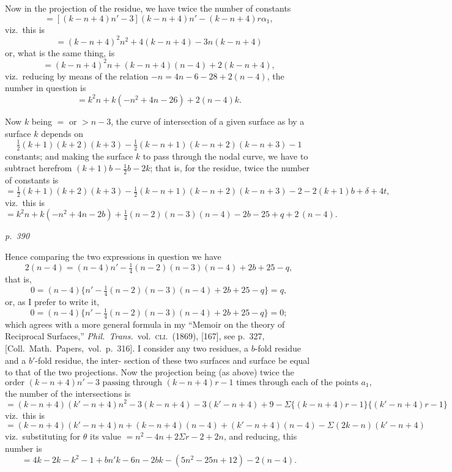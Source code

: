 \documentclass[11pt,a4paper]{article}
\theoremstyle{plain}
\theoremstyle{definition}
\begin{document}
Now in the projection of the residue, we have twice the number of constants
\[
= [(k - n + 4) n' - 3](k - n + 4)n' - (k - n + 4) r \alpha_1,
\]
viz.\ this is
\[
= (k - n + 4)^2 n^2 + 4(k - n + 4) - 3n(k - n + 4)
\]
or, what is the same thing, is
\[
= (k - n + 4)^2 n + (k - n + 4)(n - 4) + 2(k - n + 4),
\]
viz.\ reducing by means of the relation $-n = 4n - 6 - 28 + 2(n - 4)$, the number in
question is
\[
= k^2n + k(-n^2 + 4n - 26) + 2(n - 4) k.
\]

Now $k$ being $=$ or $> n - 3$, the curve of intersection of a given surface as by a
surface $k$ depends on
\[
\tfrac{1}{2}(k + 1)(k + 2)(k + 3) - \tfrac{1}{2}(k - n + 1)(k - n + 2)(k - n + 3) - 1
\]
constants; and making the surface $k$ to pass through the nodal curve, we have to subtract
herefrom $(k + 1)b - \tfrac{1}{2}b - 2k$; that is, for the residue, twice the number of constants is
\[
= \tfrac{1}{2}(k + 1)(k + 2)(k + 3) - \tfrac{1}{2}(k - n + 1)(k - n + 2)(k - n + 3) - 2 - 2(k + 1)b + \delta + 4t,
\]
viz.\ this is
\[
= k^2 n + k(-n^2 + 4n - 2b) + \tfrac{1}{4}(n - 2)(n - 3)(n - 4) - 2b - 25 + q + 2\,(n - 4).
\]

\clearpage

\bigskip
\textit{p.~390}
\smallskip

\noindent
Hence comparing the two expressions in question we have
\[
2(n - 4) = (n - 4)n' - \tfrac{1}{4}(n - 2)(n - 3)(n - 4) + 2 b + 25 - q,
\]
that is,
\[
0 = (n - 4)\{n' - \tfrac{1}{4}(n - 2)(n - 3)(n - 4) + 2 b + 25 - q\} = q,
\]
or, as I prefer to write it,
\[
0 = (n - 4) \{n' - \tfrac{1}{4}(n - 2)(n - 3)(n - 4) + 2 b + 25 - q\} = 0;
\]
which agrees with a more general formula in my ``Memoir on the theory of Reciprocal
Surfaces,'' \textit{Phil.\ Trans.}\ vol.\ \textsc{cli}.\ (1869), [167], see p.\ 327, [Coll.\ Math.\ Papers,\ vol.\
p.\ 316].  I consider any two residues, a $b$-fold residue and a $b'$-fold residue, the inter-
section of these two surfaces and surface be equal to that of the two projections.  Now
the projection being (as above) twice the
\[
\text{order } (k - n + 4)n' - 3 \text{ passing through } (k - n + 4)r - 1 \text{ times through each of the points } a_1,
\]
the number of the intersections is
\[
= (k - n + 4)(k' - n + 4)n^2 - 3(k - n + 4) - 3(k' - n + 4) + 9 - \Sigma\{(k - n + 4)r - 1\}\{(k' - n + 4)r - 1\}
\]
viz.\ this is
\[
= (k - n + 4)(k' - n + 4)n + (k - n + 4)(n - 4) + (k' - n + 4)(n - 4) - \Sigma(2k - n)(k' - n + 4)
\]
viz.\ substituting for $\theta$ its value $= n^2 - 4n + 2 \Sigma r - 2 + 2n$, and reducing, this number is
\[
= 4k - 2k - k^2 - 1 + bn'k - 6n - 2 b k - (5n^2 - 25n + 12) - 2(n - 4).
\]
\end{document}
